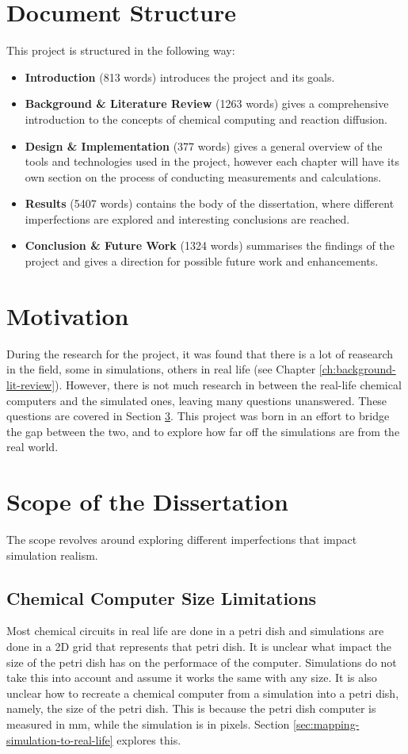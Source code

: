 \section{Document Structure}
This project is structured in the following way:

\begin{itemize}
    \item \textbf{Introduction} (813 words) introduces the project and its goals.
    \item \textbf{Background \& Literature Review} (1263 words) gives a comprehensive introduction to the concepts of chemical computing and reaction diffusion.
    \item \textbf{Design \& Implementation} (377 words) gives a general overview of the tools and technologies used in the project, however each chapter will have its own section on the process of conducting measurements and calculations.
    \item \textbf{Results} (5407 words) contains the body of the dissertation, where different imperfections are explored and interesting conclusions are reached.
    \item \textbf{Conclusion \& Future Work} (1324 words) summarises the findings of the project and gives a direction for possible future work and enhancements.
\end{itemize}

\section{Motivation}
During the research for the project, it was found that there is a lot of reasearch in the field, some in simulations, others in real life (see Chapter \ref{ch:background-lit-review}). 
However, there is not much research in between the real-life chemical computers and the simulated ones, leaving many questions unanswered. These questions are covered in Section \ref{sec:goals}.
This project was born in an effort to bridge the gap between the two, and to explore how far off the simulations are from the real world.


\section{Scope of the Dissertation}\label{sec:goals}
The scope revolves around exploring different imperfections that impact simulation realism.

\subsection{Chemical Computer Size Limitations} \label{sec:computer-size}
Most chemical circuits in real life are done in a petri dish and simulations are done in a 2D grid that represents that petri dish.
It is unclear what impact the size of the petri dish has on the performace of the computer. Simulations do not take this into account and assume it works the same with any size. 
It is also unclear how to recreate a chemical computer from a simulation into a petri dish, namely, the size of the petri dish. 
This is because the petri dish computer is measured in mm, while the simulation is in pixels. Section \ref{sec:mapping-simulation-to-real-life} explores this.

